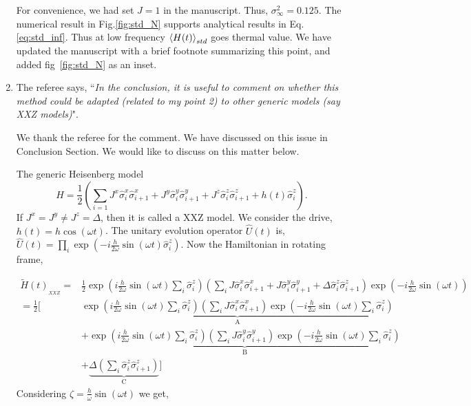 \documentclass[aps,prb,reprint,showpacs,floatfix,superscriptaddress, onecolumn, nofootinbib, 9pt]{revtex4-2}
\newcommand{\response}[1]{{\color{black}#1}} %
\newcommand{\comment}[1]{{\color{blue}#1}} %
\begin{document}
\begin{enumerate}
{For convenience, we had set $J=1$ in the manuscript. Thus, $\sigma_\infty^2 = 0.125$. The numerical result in Fig.\ref{fig:std_N} supports analytical results in Eq. \eqref{eq:std_inf}. Thus at low frequency $\expval{H(t)}_{std}$ goes thermal value. We have updated the manuscript with a brief footnote summarizing this point, and added fig~\ref{fig:std_N} as an inset.
}


\vskip 2cm
\item The referee says, \comment{``\textit{In the conclusion, it is useful to comment on whether this method could be adapted (related to my point 2) to other generic models (say XXZ models)}"}.\\

\response{
We thank the referee for the comment. We have discussed on this issue in Conclusion Section. We would like to discuss on this matter below. 

The generic Heisenberg model
\begin{equation*}
	H = \frac12 \left( \sum_{i=1} J^x \hat{\sigma}^x_i \hat{\sigma}^x_{i+1} +J^y  \hat{\sigma}^y_i \hat{\sigma}^y_{i+1} + J^z  \hat{\sigma}^z_i \hat{\sigma}^z_{i+1} + h(t)  \hat{\sigma}^z_i\right).
	\label{eq:heisenberg_model}
\end{equation*}
If $J^x= J^y \neq J^z=\Delta$, then it is called a XXZ model. We consider the drive, $h(t) = h \cos(\omega t)$. The unitary evolution operator $\displaystyle \hat{U}(t)$ is, $\hat{U}(t)=\prod_{i} \exp \left(-i \frac{h}{2 \omega} \sin (\omega t) \hat{\sigma}_{i}^{z}\right)$. Now the Hamiltonian in rotating frame,
	
\begin{align}
	\tilde{H}(t)_{_{XXZ}}= & \frac{1}{2} \exp \left(i \frac{h}{2 \omega} \sin (\omega t) \sum_{i} \hat{\sigma}_{i}^{z}\right)\left(\sum_{i} J \hat{\sigma}^x_i \hat{\sigma}^x_{i+1} + J \hat{\sigma}^y_i \hat{\sigma}^y_{i+1}+ \Delta  \hat{\sigma}^z_i \hat{\sigma}^z_{i+1}\right) \exp \left(-i \frac{h}{2 \omega} \sin (\omega t)\right)\nonumber\\
	= \frac12 \Bigg[& \underbrace{\exp \left(i \frac{h}{2 \omega} \sin (\omega t) \sum_{i} \hat{\sigma}_{i}^{z}\right)\left(\sum_{i} J \hat{\sigma}_{i}^{x} \hat{\sigma}_{i+1}^{x}\right) \exp \left(-i \frac{h}{2 \omega} \sin (\omega t) \sum_i\hat{\sigma}_{i}^{z}\right)}_{\mathrm{A}} \nonumber\\
	& +\underbrace{\exp \left(i \frac{h}{2 \omega} \sin (\omega t) \sum_{i} \hat{\sigma}_{i}^{z}\right)\left(\sum_{i} J \hat{\sigma}_{i}^{y} \hat{\sigma}_{i+1}^{y}\right) \exp \left(-i \frac{h}{2 \omega} \sin (\omega t) \sum_i\hat{\sigma}_{i}^{z}\right)}_{\mathrm{B}} \nonumber\\
	& +\underbrace{\Delta \left(\sum_{i}  \hat{\sigma}_{i}^{z} \hat{\sigma}_{i+1}^{z}\right)}_{\mathrm{C}}\Bigg]
	\label{eq:xxz1}
\end{align}
Considering $\zeta = \frac{h}{\omega}\sin(\omega t)$ we get,

}
\end{enumerate}
\end{document}
